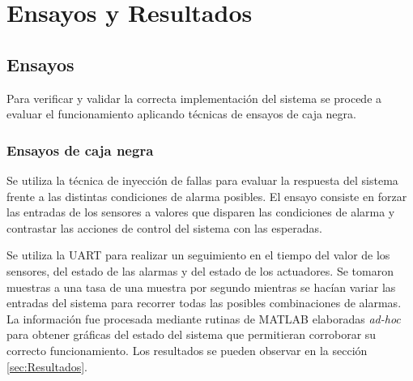 
\chapter{Ensayos y Resultados} %

\label{Chapter4} %


\section{Ensayos}
\label{sec:Ensayos}

Para verificar y validar la correcta implementación del sistema se procede a evaluar el funcionamiento aplicando técnicas de ensayos de caja negra.



\subsection{Ensayos de caja negra}

Se utiliza la técnica de inyección de fallas para evaluar la respuesta del sistema frente a las distintas condiciones de alarma posibles.  El ensayo consiste en forzar las entradas de los sensores a valores que disparen las condiciones de alarma y contrastar las acciones de control del sistema con las esperadas.

Se utiliza la UART para realizar un seguimiento en el tiempo del valor de los sensores, del estado de las alarmas y del estado de los actuadores. Se tomaron muestras a una tasa de una muestra por segundo mientras se hacían variar las entradas del sistema para recorrer todas las posibles combinaciones de alarmas. La información fue procesada mediante rutinas de MATLAB elaboradas \textit{ad-hoc} para obtener gráficas del estado del sistema que permitieran corroborar su correcto funcionamiento. Los resultados se pueden observar en la sección \ref{sec:Resultados}. 

